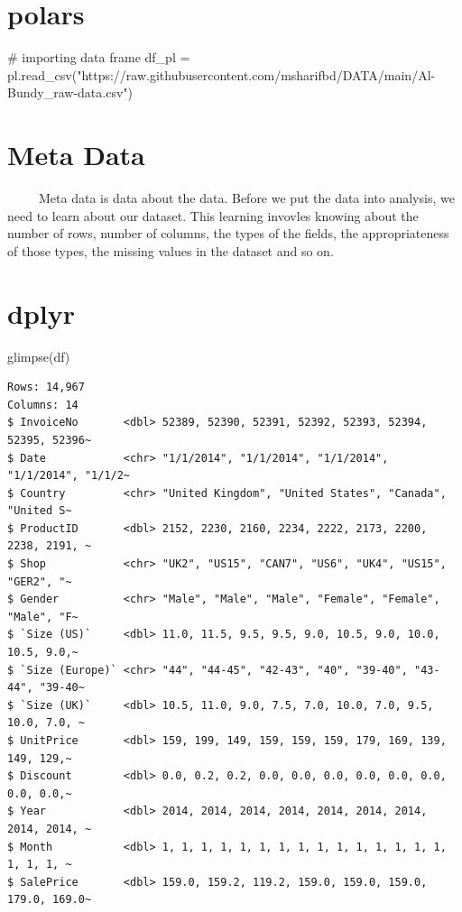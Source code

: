 \documentclass[
  letterpaper,
  DIV=11,
  numbers=noendperiod]{scrreprt}
\newenvironment{Shaded}{\begin{snugshade}}{\end{snugshade}}
\newcommand{\CommentTok}[1]{\textcolor[rgb]{0.37,0.37,0.37}{#1}}
\newcommand{\FunctionTok}[1]{\textcolor[rgb]{0.28,0.35,0.67}{#1}}
\newcommand{\NormalTok}[1]{\textcolor[rgb]{0.00,0.23,0.31}{#1}}
\newcommand{\OperatorTok}[1]{\textcolor[rgb]{0.37,0.37,0.37}{#1}}
\newcommand{\StringTok}[1]{\textcolor[rgb]{0.13,0.47,0.30}{#1}}
\begin{document}
\section{polars}

\begin{Shaded}
\begin{Highlighting}[]
\CommentTok{\# importing data frame }
\NormalTok{df\_pl }\OperatorTok{=}\NormalTok{ pl.read\_csv(}\StringTok{"https://raw.githubusercontent.com/msharifbd/DATA/main/Al{-}Bundy\_raw{-}data.csv"}\NormalTok{)}
\end{Highlighting}
\end{Shaded}

\section{Meta Data}\label{meta-data}

~~~~~Meta data is data about the data. Before we put the data into
analysis, we need to learn about our dataset. This learning invovles
knowing about the number of rows, number of columns, the types of the
fields, the appropriateness of those types, the missing values in the
dataset and so on.

\section{dplyr}

\begin{Shaded}
\begin{Highlighting}[]
\FunctionTok{glimpse}\NormalTok{(df)}
\end{Highlighting}
\end{Shaded}

\begin{verbatim}
Rows: 14,967
Columns: 14
$ InvoiceNo       <dbl> 52389, 52390, 52391, 52392, 52393, 52394, 52395, 52396~
$ Date            <chr> "1/1/2014", "1/1/2014", "1/1/2014", "1/1/2014", "1/1/2~
$ Country         <chr> "United Kingdom", "United States", "Canada", "United S~
$ ProductID       <dbl> 2152, 2230, 2160, 2234, 2222, 2173, 2200, 2238, 2191, ~
$ Shop            <chr> "UK2", "US15", "CAN7", "US6", "UK4", "US15", "GER2", "~
$ Gender          <chr> "Male", "Male", "Male", "Female", "Female", "Male", "F~
$ `Size (US)`     <dbl> 11.0, 11.5, 9.5, 9.5, 9.0, 10.5, 9.0, 10.0, 10.5, 9.0,~
$ `Size (Europe)` <chr> "44", "44-45", "42-43", "40", "39-40", "43-44", "39-40~
$ `Size (UK)`     <dbl> 10.5, 11.0, 9.0, 7.5, 7.0, 10.0, 7.0, 9.5, 10.0, 7.0, ~
$ UnitPrice       <dbl> 159, 199, 149, 159, 159, 159, 179, 169, 139, 149, 129,~
$ Discount        <dbl> 0.0, 0.2, 0.2, 0.0, 0.0, 0.0, 0.0, 0.0, 0.0, 0.0, 0.0,~
$ Year            <dbl> 2014, 2014, 2014, 2014, 2014, 2014, 2014, 2014, 2014, ~
$ Month           <dbl> 1, 1, 1, 1, 1, 1, 1, 1, 1, 1, 1, 1, 1, 1, 1, 1, 1, 1, ~
$ SalePrice       <dbl> 159.0, 159.2, 119.2, 159.0, 159.0, 159.0, 179.0, 169.0~
\end{verbatim}
\end{document}
